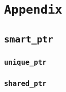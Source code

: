 \newpage
\chapter{\tt Appendix}
\thispagestyle{fancy}
\section{\tt smart\_ptr}
\subsection{\tt unique\_ptr}

\subsection{\tt shared\_ptr}


